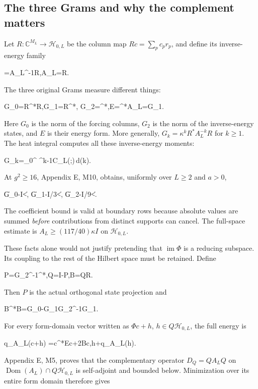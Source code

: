 \documentclass[11pt,a4paper]{article}
\renewcommand{\[}{\begingroup\small\originaldisplaystart}
\renewcommand{\]}{\originaldisplayend\endgroup}
\begin{document}
\subsection{The three Grams and why the complement
matters}\label{the-three-grams-and-why-the-complement-matters}

Let \(R:\mathbb C^{M_L}\to\mathcal H_{0,L}\) be the column map
\(Rc=\sum_pc_pr_p\), and define its inverse-energy family

\[
\Phi=\kappa A_L^{-1}R,\qquad A_L\Phi=\kappa R.
\]

The three original Grams measure different things:

\[
G_0=R^*R,\qquad G_1=R^*\Phi,\qquad
G_2=\Phi^*\Phi,\qquad E=\Phi^*A_L\Phi=\kappa G_1.
\]

Here \(G_0\) is the norm of the forcing columns, \(G_2\) is the norm of
the inverse-energy states, and \(E\) is their energy form. More
generally, \(G_k=\kappa^kR^*A_L^{-k}R\) for \(k\geq1\). The heat
integral computes all these inverse-energy moments:

\[
G_k=\int_0^\infty
\tau^{k-1}\widehat C_L(\tau;\xi)\,d\tau\quad(k).
\]

At \(g^2\geq16\), Appendix E, M10, obtains, uniformly over \(L\geq2\)
and \(a>0\),

\[
\|G_0-I\|<,\qquad
\|G_1-I/3\|<,\qquad
\|G_2-I/9\|<.
\]

The coefficient bound is valid at boundary rows because absolute values
are summed \emph{before} contributions from distinct supports can
cancel. The full-space estimate is \(A_L\geq(117/40)\kappa I\) on
\(\mathcal H_{0,L}\).

These facts alone would not justify pretending that
\(\operatorname{im}\Phi\) is a reducing subspace. Its coupling to the
rest of the Hilbert space must be retained. Define

\[
P=\Phi G_2^{-1}\Phi^*,\qquad Q=I-P,\qquad B=QR.
\]

Then \(P\) is the actual orthogonal state projection and

\[
B^*B=G_0-G_1G_2^{-1}G_1.
\]

For every form-domain vector written as \(\Phi c+h\),
\(h\in Q\mathcal H_{0,L}\), the full energy is

\[
q_{A_L}(\Phi c+h)
=c^*Ec+2\kappa{}\langle Bc,h\rangle+q_{A_L}(h).
\]

Appendix E, M5, proves that the complementary operator \(D_Q=QA_LQ\) on
\(\operatorname{Dom}(A_L)\cap Q\mathcal H_{0,L}\) is self-adjoint and
bounded below. Minimization over its entire form domain therefore gives
\end{document}
